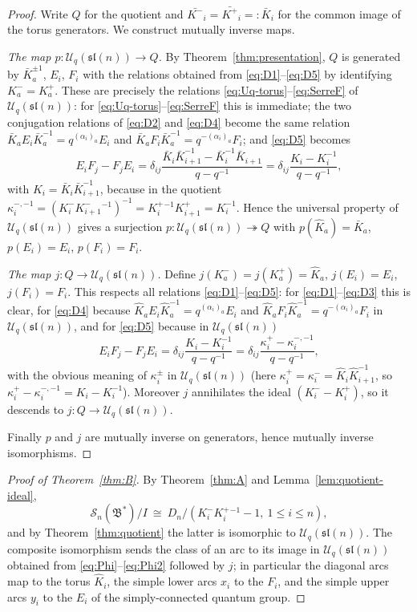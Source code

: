 \documentclass[11pt]{amsart}
\newcommand{\U}{\mathscr U}
\newcommand{\sl}{\mathfrak{sl}}
\newcommand{\KP}{K^{+}}
\newcommand{\KM}{K^{-}}
\newcommand{\al}{\alpha}
\theoremstyle{plain}
\theoremstyle{definition}
\numberwithin{equation}{section}
\begin{document}
\begin{proof}
Write $Q$ for the quotient and $\bar{\KM}_i=\bar{\KP}_i=:\bar K_i$ for the
common image of the torus generators.  We construct mutually inverse maps.

\emph{The map $p:\U_q(\sl(n))\to Q$.}  By
Theorem~\ref{thm:presentation}, $Q$ is generated by
$\bar K_a^{\pm1}$, $E_i$, $F_i$ with the relations obtained from
\eqref{eq:D1}--\eqref{eq:D5} by identifying $\KM_a=\KP_a$.  These are
precisely the relations \eqref{eq:Uq-torus}--\eqref{eq:SerreF} of
$\U_q(\sl(n))$: for \eqref{eq:Uq-torus}--\eqref{eq:SerreF} this is immediate;
the two conjugation relations of \eqref{eq:D2} and \eqref{eq:D4} become the
same relation $\bar K_aE_i\bar K_a^{-1}=q^{(\al_i)_a}E_i$ and
$\bar K_aF_i\bar K_a^{-1}=q^{-(\al_i)_a}F_i$; and \eqref{eq:D5} becomes
\[
E_iF_j-F_jE_i=\delta_{ij}\frac{\bar K_i\bar K_{i+1}^{-1}
-\bar K_i^{-1}\bar K_{i+1}}{q-q^{-1}}
=\delta_{ij}\frac{K_i-K_i^{-1}}{q-q^{-1}},
\]
with $K_i=\bar K_i\bar K_{i+1}^{-1}$, because in the quotient
$\kappa_i^{-,-1}=(\KM_i\KM_{i+1}^{-1})^{-1}
=\KP_i^{-1}\KP_{i+1}=K_i^{-1}$.  Hence the universal property of
$\U_q(\sl(n))$ gives a surjection $p:\U_q(\sl(n))\twoheadrightarrow Q$ with
$p(\hat K_a)=\bar K_a$, $p(E_i)=E_i$, $p(F_i)=F_i$.

\emph{The map $j:Q\to\U_q(\sl(n))$.}  Define
$j(\KM_a)=j(\KP_a)=\hat K_a$, $j(E_i)=E_i$, $j(F_i)=F_i$.  This respects all
relations \eqref{eq:D1}--\eqref{eq:D5}: for \eqref{eq:D1}--\eqref{eq:D3} this
is clear, for \eqref{eq:D4} because
$\hat K_aE_i\hat K_a^{-1}=q^{(\al_i)_a}E_i$ and
$\hat K_aF_i\hat K_a^{-1}=q^{-(\al_i)_a}F_i$ in $\U_q(\sl(n))$, and for
\eqref{eq:D5} because in $\U_q(\sl(n))$
\[
E_iF_j-F_jE_i=\delta_{ij}\frac{K_i-K_i^{-1}}{q-q^{-1}}
=\delta_{ij}\frac{\kappa_i^+-\kappa_i^{-,-1}}{q-q^{-1}},
\]
with the obvious meaning of $\kappa_i^\pm$ in $\U_q(\sl(n))$ (here
$\kappa_i^{+}=\kappa_i^{-}=\hat K_i\hat K_{i+1}^{-1}$, so
$\kappa_i^+-\kappa_i^{-,-1}=K_i-K_i^{-1}$).  Moreover $j$ annihilates the
ideal $(\KM_i-\KP_i)$, so it descends to $j:Q\to\U_q(\sl(n))$.

Finally $p$ and $j$ are mutually inverse on generators, hence mutually
inverse isomorphisms.
\end{proof}

\begin{proof}[Proof of Theorem~\ref{thm:B}]
By Theorem~\ref{thm:A} and Lemma~\ref{lem:quotient-ideal},
\[
\mathscr S_n(\mathfrak B^*)/I\ \cong\
D_n/(\KM_i\KP_i^{-1}-1,\ 1\le i\le n),
\]
and by Theorem~\ref{thm:quotient} the latter is isomorphic to
$\U_q(\sl(n))$.  The composite isomorphism sends the class of an arc to its
image in $\U_q(\sl(n))$ obtained from \eqref{eq:Phi}--\eqref{eq:Phi2}
followed by $j$; in particular the diagonal arcs map to the torus
$\hat K_i$, the simple lower arcs $x_i$ to the $F_i$, and the simple upper
arcs $y_i$ to the $E_i$ of the simply-connected quantum group.
\end{proof}
\end{document}

